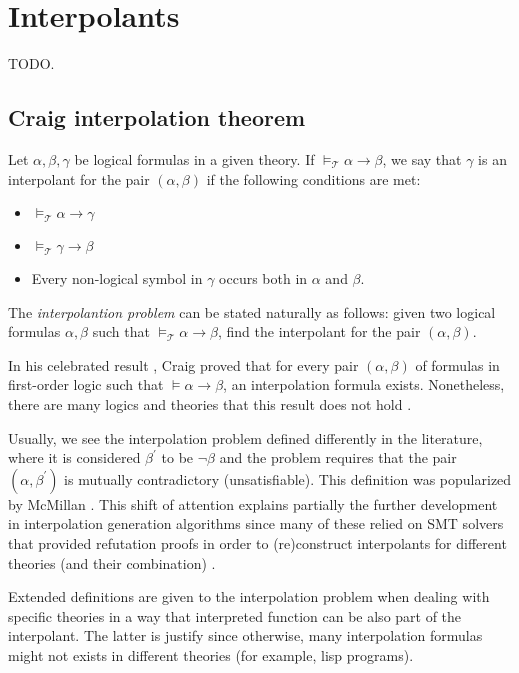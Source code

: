 \section{Interpolants}

TODO.

\subsection{Craig interpolation theorem}

Let $\alpha, \beta, \gamma$ be logical formulas in a given theory. If
$\models_{\mathcal{T}} \alpha \rightarrow \beta$, we say that $\gamma$ is an
interpolant for the pair $(\alpha, \beta)$ if the following conditions
are met:

\begin{itemize}
\item $\models_{\mathcal{T}} \alpha \rightarrow \gamma$
\item $\models_{\mathcal{T}} \gamma \rightarrow \beta$
\item Every non-logical symbol in $\gamma$ occurs both in $\alpha$ and
  $\beta$.
\end{itemize}

The \emph{interpolantion problem} can be stated naturally as 
follows: given two logical formulas $\alpha, \beta$ such that 
$\models_{\mathcal{T}} \alpha \rightarrow \beta$, find
the interpolant for the pair $(\alpha, \beta)$.

In his celebrated result \cite{10.2307/2963594}, Craig proved that for every pair
$(\alpha, \beta)$ of formulas in first-order logic such that
$\models \alpha \rightarrow \beta$, an interpolation formula exists. Nonetheless,
there are many logics and theories that this result does not hold \cite{komori1978}.

Usually, we see the interpolation problem defined differently in the literature, 
where it is considered $\beta^{'}$ to be $\neg \beta$ and 
the problem requires that the pair $(\alpha, \beta^{'})$
is mutually contradictory (unsatisfiable). This definition was popularized by 
McMillan \cite{10.1007/978-3-540-24730-2_2}. This shift of attention explains 
partially the further development in interpolation generation algorithms 
since many of these relied on SMT solvers that provided refutation proofs 
in order to (re)construct interpolants for different theories (and their 
combination) \cite{10.1007/978-3-642-02959-2_17, 
10.1007/978-3-642-36742-7_9, mcmillan2011interpolants}.

Extended definitions are given to the interpolation problem when dealing with specific
theories \cite{10.1007/11532231_26} in a way that interpreted function can be also part of
the interpolant. The latter is justify since otherwise, many interpolation formulas might
not exists in different theories (for example, lisp programs).

